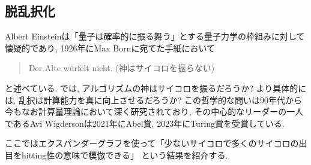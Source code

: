 \subsection{脱乱択化}
Albert Einsteinは「量子は確率的に振る舞う」とする量子力学の枠組みに対して懐疑的であり,
1926年にMax Bornに宛てた手紙において
\begin{quotation}
    Der Alte würfelt nicht. (神はサイコロを振らない)
\end{quotation}
と述べている.
では, アルゴリズムの神はサイコロを振るだろうか?
より具体的には, 乱択は計算能力を真に向上させるだろうか?
この哲学的な問いは90年代から今もなお計算量理論において深く研究されており,
その中心的なリーダーの一人であるAvi Wigdersonは2021年にAbel賞, 2023年にTuring賞を受賞している.

ここではエクスパンダーグラフを使って「少ないサイコロで多くのサイコロの出目をhitting性の意味で模倣できる」
という結果を紹介する.

